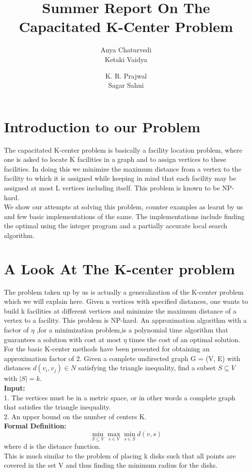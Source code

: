 \documentclass[12pt,a4paper,onecolumn]{article}
\author{Anya Chaturvedi \\ Ketaki Vaidya \and K. R. Prajwal \\ Sagar Sahni  }
\title{Summer Report On The Capacitated K-Center Problem}
\begin{document}
\maketitle
\section{Introduction to our Problem}
The capacitated K-center problem is basically a facility location problem, where one is asked to locate K facilities in a graph and to assign vertices to these facilities. In doing this we minimize
the maximum distance from a vertex to the facility to which it is assigned while keeping in mind that each facility may be assigned at most L vertices including itself. This problem is known to be NP-hard.\\
We show our attempts at solving this problem, counter examples as learnt by us and few basic implementations of the same. The implementations include finding the optimal using the integer program and a partially accurate local search algorithm.
\section{A Look At The K-center problem}
The problem taken up by us is actually a generalization of the K-center problem which we will explain here. Given n vertices with specified distances, one wants to build k facilities at different vertices and minimize the maximum distance of a vertex to a facility. This problem is NP-hard. An approximation algorithm with a factor of $\eta$ ,for a minimization problem,is
a polynomial time algorithm that guarantees a solution with cost at most $\eta$ times the cost of an optimal solution. For the basic K-center methods have been presented for obtaining an approximation factor of 2. Given a complete undirected graph G = (V, E) with distances $d(v_i, v_j) \in N$ satisfying the triangle inequality, find a subset $S \subseteq V$ with $|S| = k$.\\ \textbf{Input:}\\1. The vertices must be in a metric space, or in other words a complete graph that satisfies the triangle inequality.\\2. An
upper bound on the number of centers K.\\
\textbf{Formal Definition:}\\
$$\min_{S \subseteq V}\max_{v \in V}\min_{s \in S}d(v,s)$$
where d is the distance function.\\
This is much similar to the problem of placing k disks such that all points are covered in the set V and thus finding the minimum radius for the disks.
\end{document}
